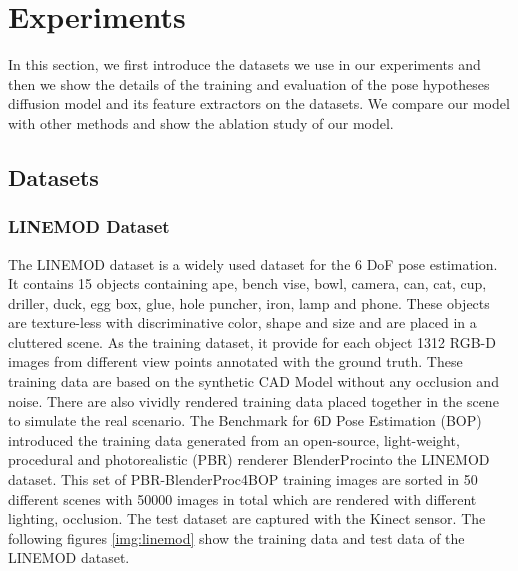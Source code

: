 \documentclass[12pt,DIV14,BCOR12mm,a4paper,footinclude=false,headinclude,parskip=half-,twoside,openright,cleardoublepage=empty,toc=index,bibliography=totoc,listof=totoc]{scrreprt}
\numberwithin{equation}{chapter}
\begin{document}
\chapter{Experiments}
In this section, we first introduce the datasets we use in our experiments and then we show the details of the training and evaluation of the pose hypotheses diffusion model and its feature extractors on the datasets. We compare our model with other methods and show the ablation study of our model.
\section{Datasets}
\subsection{LINEMOD Dataset}
The LINEMOD dataset \cite{hinterstoisser2012model} is a widely used dataset for the 6 DoF pose estimation. It contains 15 objects containing ape, bench vise, bowl, camera, can, cat, cup, driller, duck, egg box, glue, hole puncher, iron, lamp and phone. These objects are texture-less with discriminative color, shape and size and are placed in a cluttered scene. As the training dataset, it provide for each object 1312 RGB-D images from different view points annotated with the ground truth. These training data are based on the synthetic CAD Model without any occlusion and noise. There are also vividly rendered training data placed together in the scene to simulate the real scenario. The Benchmark for 6D Pose Estimation (BOP) \cite{hodan2018bop}introduced the training data generated from an open-source, light-weight, procedural and photorealistic (PBR) renderer BlenderProc\cite{denninger2019blenderproc}into the LINEMOD dataset.
This set of PBR-BlenderProc4BOP training images are sorted in 50 different scenes with 50000 images in total which are rendered with different lighting, occlusion. The test dataset are captured with the Kinect sensor. The following figures \ref{img:linemod} show the training data and test data of the LINEMOD dataset.
\end{document}
